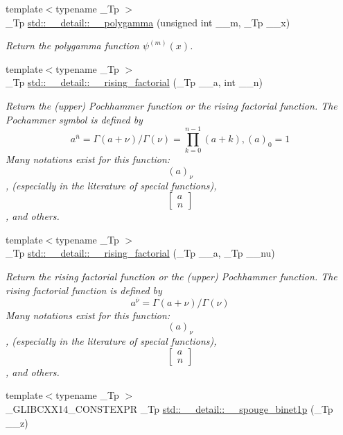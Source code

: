 \begin{DoxyCompactItemize}
{\footnotesize template$<$typename \+\_\+\+Tp $>$ }\\\+\_\+\+Tp \hyperlink{namespacestd_1_1____detail_a25cc1b7c8adbc3b0fc8d4487ab23571c}{std\+::\+\_\+\+\_\+detail\+::\+\_\+\+\_\+polygamma} (unsigned int \+\_\+\+\_\+m, \+\_\+\+Tp \+\_\+\+\_\+x)
\begin{DoxyCompactList}\small\item\em Return the polygamma function $ \psi^{(m)}(x) $. \end{DoxyCompactList}\item 
{\footnotesize template$<$typename \+\_\+\+Tp $>$ }\\\+\_\+\+Tp \hyperlink{namespacestd_1_1____detail_a5a4c41ee568639f8de4508051da9954a}{std\+::\+\_\+\+\_\+detail\+::\+\_\+\+\_\+rising\+\_\+factorial} (\+\_\+\+Tp \+\_\+\+\_\+a, int \+\_\+\+\_\+n)
\begin{DoxyCompactList}\small\item\em Return the (upper) Pochhammer function or the rising factorial function. The Pochammer symbol is defined by \[ a^{\overline{n}} = \Gamma(a + \nu) / \Gamma(\nu) = \prod_{k=0}^{n-1} (a + k), (a)_0 = 1 \] Many notations exist for this function\+: \[ (a)_\nu \], (especially in the literature of special functions), \[ \left[ \begin{array}{c} a \\ n \end{array} \right] \], and others. \end{DoxyCompactList}\item 
{\footnotesize template$<$typename \+\_\+\+Tp $>$ }\\\+\_\+\+Tp \hyperlink{namespacestd_1_1____detail_a109a13aa776d60bdc49b1cedc0e77670}{std\+::\+\_\+\+\_\+detail\+::\+\_\+\+\_\+rising\+\_\+factorial} (\+\_\+\+Tp \+\_\+\+\_\+a, \+\_\+\+Tp \+\_\+\+\_\+nu)
\begin{DoxyCompactList}\small\item\em Return the rising factorial function or the (upper) Pochhammer function. The rising factorial function is defined by \[ a^{\overline{\nu}} = \Gamma(a + \nu) / \Gamma(\nu) \] Many notations exist for this function\+: \[ (a)_\nu \], (especially in the literature of special functions), \[ \left[ \begin{array}{c} a \\ n \end{array} \right] \], and others. \end{DoxyCompactList}\item 
{\footnotesize template$<$typename \+\_\+\+Tp $>$ }\\\+\_\+\+G\+L\+I\+B\+C\+X\+X14\+\_\+\+C\+O\+N\+S\+T\+E\+X\+PR \+\_\+\+Tp \hyperlink{namespacestd_1_1____detail_afa9284858d2bffbdc5d79fcbab68c307}{std\+::\+\_\+\+\_\+detail\+::\+\_\+\+\_\+spouge\+\_\+binet1p} (\+\_\+\+Tp \+\_\+\+\_\+z)

\end{DoxyCompactItemize}
